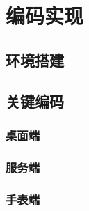 \chapter{编码实现}

\section{环境搭建}

\section{关键编码}

\subsection{桌面端}

\subsection{服务端}

\subsection{手表端}
